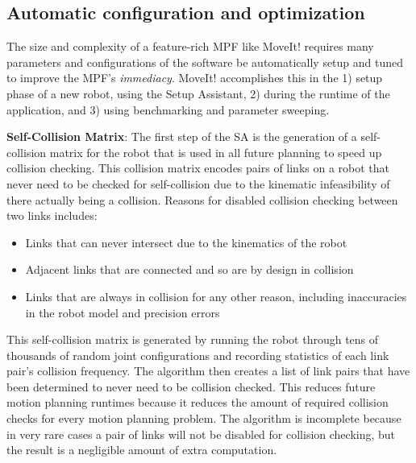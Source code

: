 \documentclass[10pt,journal,compsoc]{joser1}
\begin{document}
{%
\subsection{Automatic configuration and optimization}

The size and complexity of a feature-rich MPF like MoveIt! requires many parameters and configurations of the software be automatically setup and tuned to improve the MPF's \textit{immediacy}. MoveIt! accomplishes this in the 1) setup phase of a new robot, using the Setup Assistant, 2) during the runtime of the application, and 3) using benchmarking and parameter sweeping\cite{cohen2012generic}.

{\bf Self-Collision Matrix}: The first step of the SA is the generation of a self-collision matrix for the robot that is used in all future planning to speed up collision checking. This collision matrix encodes pairs of links on a robot that never need to be checked for self-collision due to the kinematic infeasibility of there actually being a collision. Reasons for disabled collision checking between two links includes:
\begin{itemize}
    \item Links that can never intersect due to the kinematics of the robot
    \item Adjacent links that are connected and so are by design in collision
    \item Links that are always in collision for any other reason, including inaccuracies in the robot model and precision errors
\end{itemize}

This self-collision matrix is generated by running the robot through tens of thousands of random joint configurations and recording statistics of each link pair's collision frequency. The algorithm then creates a list of link pairs that have been determined to never need to be collision checked. This reduces future motion planning runtimes because it reduces the amount of required collision checks for every motion planning problem. The algorithm is incomplete because in very rare cases a pair of links will not be disabled for collision checking, but the result is a negligible amount of extra computation.

}
\end{document}
